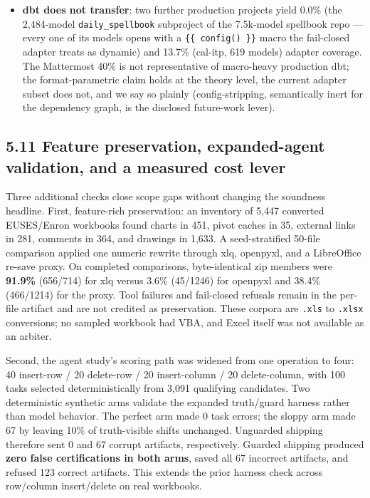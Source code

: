 \documentclass[
  11pt,
]{article}
\begin{document}
\begin{itemize}
  function argument) --- refused by the guard; zero false
  certifications; refusals of correct work were 0 in both live arms (v1
  live: 0 careful, 2 hasty truth-partial). A like-for-like measurement
  of the range-head fix's cost effect uses the deterministic synthetic
  perfect-agent arm: its refusals fell \textbf{5 → 4} pre-fix to
  post-fix --- the fix eliminated exactly the one refusal class it
  addressed, no more. The pre-registered ``mid-tier errs less''
  prediction was disconfirmed (1 vs 0 --- counts at trivial error
  rates).
\item
  \textbf{dbt does not transfer}: two further production projects yield
  0.0\% (the 2,484-model \texttt{daily\_spellbook} subproject of the
  7.5k-model spellbook repo --- every one of its models opens with a
  \texttt{\{\{\ config()\ \}\}} macro the fail-closed adapter treats as
  dynamic) and 13.7\% (cal-itp, 619 models) adapter coverage. The
  Mattermost 40\% is not representative of macro-heavy production dbt;
  the format-parametric claim holds at the theory level, the current
  adapter subset does not, and we say so plainly (config-stripping,
  semantically inert for the dependency graph, is the disclosed
  future-work lever).
\end{itemize}

\subsection{5.11 Feature preservation, expanded-agent validation, and a
measured cost
lever}\label{feature-preservation-expanded-agent-validation-and-a-measured-cost-lever}

Three additional checks close scope gaps without changing the soundness
headline. First, feature-rich preservation: an inventory of 5,447
converted EUSES/Enron workbooks found charts in 451, pivot caches in 35,
external links in 281, comments in 364, and drawings in 1,633. A
seed-stratified 50-file comparison applied one numeric rewrite through
xlq, openpyxl, and a LibreOffice re-save proxy. On completed
comparisons, byte-identical zip members were \textbf{91.9\%} (656/714)
for xlq versus 3.6\% (45/1246) for openpyxl and 38.4\% (466/1214) for
the proxy. Tool failures and fail-closed refusals remain in the per-file
artifact and are not credited as preservation. These corpora are
\texttt{.xls} to \texttt{.xlsx} conversions; no sampled workbook had
VBA, and Excel itself was not available as an arbiter.

Second, the agent study's scoring path was widened from one operation to
four: 40 insert-row / 20 delete-row / 20 insert-column / 20
delete-column, with 100 tasks selected deterministically from 3,091
qualifying candidates. Two deterministic synthetic arms validate the
expanded truth/guard harness rather than model behavior. The perfect arm
made 0 task errors; the sloppy arm made 67 by leaving 10\% of
truth-visible shifts unchanged. Unguarded shipping therefore sent 0 and
67 corrupt artifacts, respectively. Guarded shipping produced
\textbf{zero false certifications in both arms}, saved all 67 incorrect
artifacts, and refused 123 correct artifacts. This extends the prior
harness check across row/column insert/delete on real workbooks.
\end{document}
